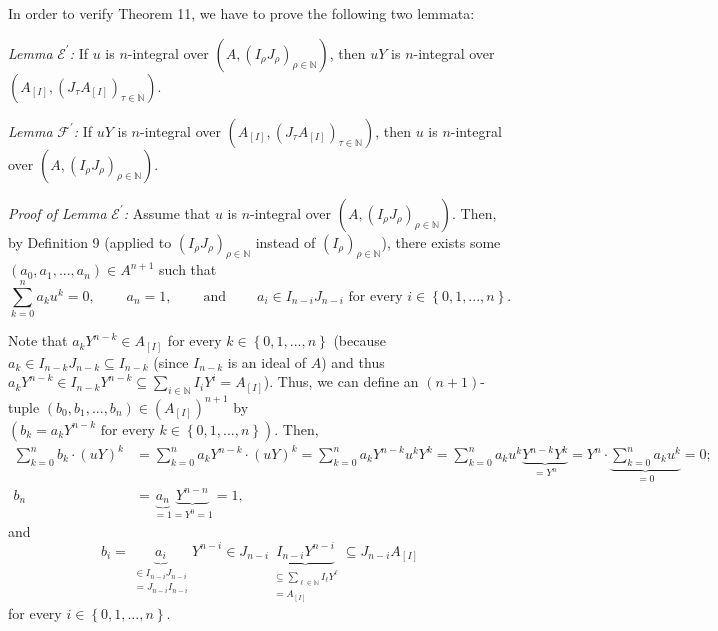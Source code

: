 \documentclass[12pt,final,notitlepage,onecolumn]{article}%
\begin{document}
In order to verify Theorem 11, we have to prove the following two lemmata:

\textit{Lemma }$\mathcal{E}^{\prime}$\textit{:} If $u$ is $n$-integral over
$\left(  A,\left(  I_{\rho}J_{\rho}\right)  _{\rho\in\mathbb{N}}\right)  $,
then $uY$ is $n$-integral over $\left(  A_{\left[  I\right]  },\left(
J_{\tau}A_{\left[  I\right]  }\right)  _{\tau\in\mathbb{N}}\right)  $.

\textit{Lemma} $\mathcal{F}^{\prime}$\textit{:} If $uY$ is $n$-integral over
$\left(  A_{\left[  I\right]  },\left(  J_{\tau}A_{\left[  I\right]  }\right)
_{\tau\in\mathbb{N}}\right)  $, then $u$ is $n$-integral over $\left(
A,\left(  I_{\rho}J_{\rho}\right)  _{\rho\in\mathbb{N}}\right)  $.

\textit{Proof of Lemma }$\mathcal{E}^{\prime}$\textit{:} Assume that $u$ is
$n$-integral over $\left(  A,\left(  I_{\rho}J_{\rho}\right)  _{\rho
\in\mathbb{N}}\right)  $. Then, by Definition 9 (applied to $\left(  I_{\rho
}J_{\rho}\right)  _{\rho\in\mathbb{N}}$ instead of $\left(  I_{\rho}\right)
_{\rho\in\mathbb{N}}$), there exists some $\left(  a_{0},a_{1},...,a_{n}%
\right)  \in A^{n+1}$ such that%
\[
\sum\limits_{k=0}^{n}a_{k}u^{k}=0,\ \ \ \ \ \ \ \ \ \ a_{n}%
=1,\ \ \ \ \ \ \ \ \ \ \text{and}\ \ \ \ \ \ \ \ \ \ a_{i}\in I_{n-i}%
J_{n-i}\text{ for every }i\in\left\{  0,1,...,n\right\}  .
\]


Note that $a_{k}Y^{n-k}\in A_{\left[  I\right]  }$ for every $k\in\left\{
0,1,...,n\right\}  $ (because $a_{k}\in I_{n-k}J_{n-k}\subseteq I_{n-k}$
(since $I_{n-k}$ is an ideal of $A$) and thus $a_{k}Y^{n-k}\in I_{n-k}%
Y^{n-k}\subseteq\sum\limits_{i\in\mathbb{N}}I_{i}Y^{i}=A_{\left[  I\right]  }%
$). Thus, we can define an $\left(  n+1\right)  $-tuple $\left(  b_{0}%
,b_{1},...,b_{n}\right)  \in\left(  A_{\left[  I\right]  }\right)  ^{n+1}$ by
$\left(  b_{k}=a_{k}Y^{n-k}\text{ for every }k\in\left\{  0,1,...,n\right\}
\right)  $. Then,%
\begin{align*}
\sum\limits_{k=0}^{n}b_{k}\cdot\left(  uY\right)  ^{k}  &  =\sum
\limits_{k=0}^{n}a_{k}Y^{n-k}\cdot\left(  uY\right)  ^{k}=\sum\limits_{k=0}%
^{n}a_{k}Y^{n-k}u^{k}Y^{k}=\sum\limits_{k=0}^{n}a_{k}u^{k}\underbrace{Y^{n-k}%
Y^{k}}_{=Y^{n}}=Y^{n}\cdot\underbrace{\sum\limits_{k=0}^{n}a_{k}u^{k}}%
_{=0}=0;\\
b_{n}  &  =\underbrace{a_{n}}_{=1}\underbrace{Y^{n-n}}_{=Y^{0}=1}=1,
\end{align*}
and%
\[
b_{i}=\underbrace{a_{i}}_{\substack{\in I_{n-i}J_{n-i}\\=J_{n-i}I_{n-i}%
}}Y^{n-i}\in J_{n-i}\underbrace{I_{n-i}Y^{n-i}}_{\substack{\subseteq
\sum\limits_{\ell\in\mathbb{N}}I_{\ell}Y^{\ell}\\=A_{\left[  I\right]  }%
}}\subseteq J_{n-i}A_{\left[  I\right]  }%
\]
for every $i\in\left\{  0,1,...,n\right\}  $.
\end{document}
